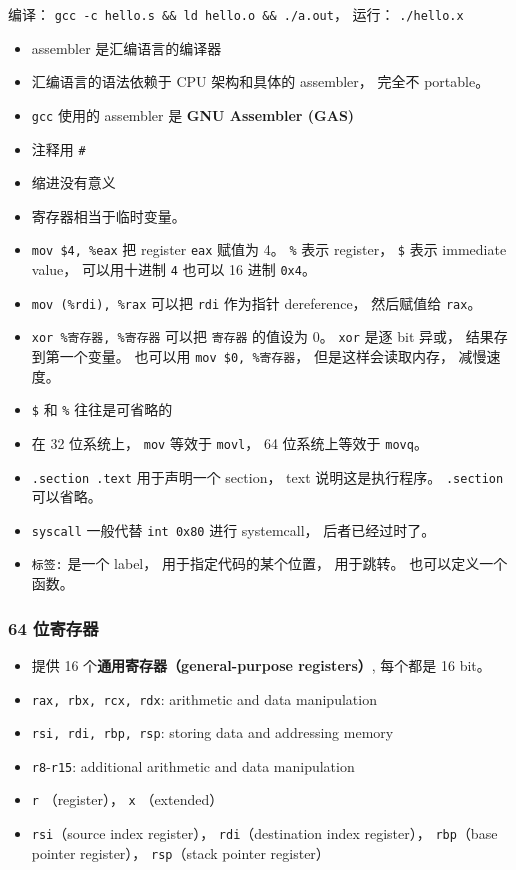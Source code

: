 编译： \verb|gcc -c hello.s && ld hello.o && ./a.out|， 运行： \verb|./hello.x|
\begin{itemize}
\item assembler 是汇编语言的编译器
\item 汇编语言的语法依赖于 CPU 架构和具体的 assembler， 完全不 portable。
\item \verb|gcc| 使用的 assembler 是 \textbf{GNU Assembler (GAS)}
\item 注释用 \verb|#|
\item 缩进没有意义
\item 寄存器相当于临时变量。
\item \verb|mov $4, %eax| 把 register \verb|eax| 赋值为 4。 \verb|%| 表示 register， \verb|$| 表示 immediate value， 可以用十进制 \verb|4| 也可以 16 进制 \verb|0x4|。
\item \verb|mov (%rdi), %rax| 可以把 \verb|rdi| 作为指针 dereference， 然后赋值给 \verb|rax|。
\item \verb|xor %寄存器, %寄存器| 可以把 \verb|寄存器| 的值设为 0。 \verb|xor| 是逐 bit 异或， 结果存到第一个变量。 也可以用 \verb|mov $0, %寄存器|， 但是这样会读取内存， 减慢速度。
\item \verb|$| 和 \verb|%| 往往是可省略的
\item 在 32 位系统上， \verb|mov| 等效于 \verb|movl|， 64 位系统上等效于 \verb|movq|。
\item \verb|.section .text| 用于声明一个 section， text 说明这是执行程序。 \verb|.section| 可以省略。
\item \verb|syscall| 一般代替 \verb|int 0x80| 进行 systemcall， 后者已经过时了。
\item \verb|标签:| 是一个 label， 用于指定代码的某个位置， 用于跳转。 也可以定义一个函数。
\end{itemize}

\subsubsection{64 位寄存器}
\begin{itemize}
\item 提供 16 个\textbf{通用寄存器（general-purpose registers）}, 每个都是 16 bit。
\item \verb|rax, rbx, rcx, rdx|: arithmetic and data manipulation
\item \verb|rsi, rdi, rbp, rsp|: storing data and addressing memory
\item \verb|r8|-\verb|r15|: additional arithmetic and data manipulation
\item \verb|r| （register）， \verb|x| （extended）
\item \verb|rsi|（source index register）， \verb|rdi|（destination index register）， \verb|rbp|（base pointer register）， \verb|rsp|（stack pointer register）
\end{itemize}

